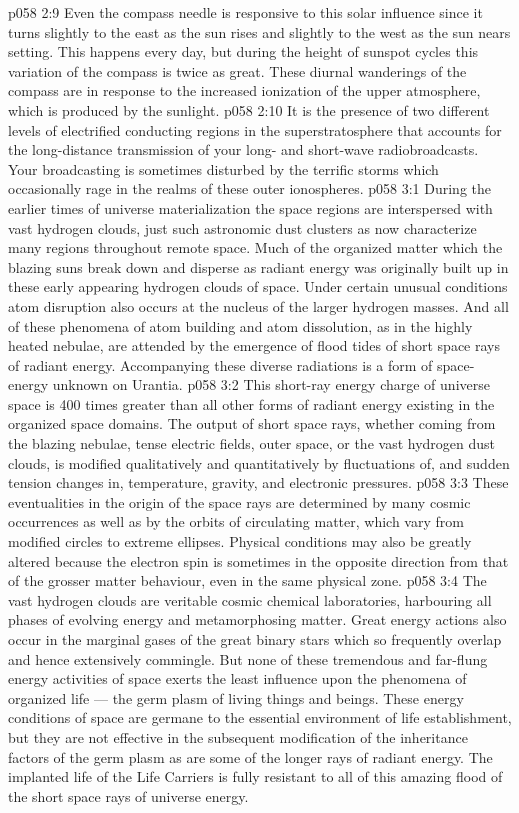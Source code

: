 \vs p058 2:9 Even the compass needle is responsive to this solar influence since it turns slightly to the east as the sun rises and slightly to the west as the sun nears setting. This happens every day, but during the height of sunspot cycles this variation of the compass is twice as great. These diurnal wanderings of the compass are in response to the increased ionization of the upper atmosphere, which is produced by the sunlight.
\vs p058 2:10 It is the presence of two different levels of electrified conducting regions in the superstratosphere that accounts for the long\hyp{}distance transmission of your long\hyp{} and short\hyp{}wave radiobroadcasts. Your broadcasting is sometimes disturbed by the terrific storms which occasionally rage in the realms of these outer ionospheres.
\vs p058 3:1 During the earlier times of universe materialization the space regions are interspersed with vast hydrogen clouds, just such astronomic dust clusters as now characterize many regions throughout remote space. Much of the organized matter which the blazing suns break down and disperse as radiant energy was originally built up in these early appearing hydrogen clouds of space. Under certain unusual conditions atom disruption also occurs at the nucleus of the larger hydrogen masses. And all of these phenomena of atom building and atom dissolution, as in the highly heated nebulae, are attended by the emergence of flood tides of short space rays of radiant energy. Accompanying these diverse radiations is a form of space\hyp{}energy unknown on Urantia.
\vs p058 3:2 This short\hyp{}ray energy charge of universe space is 400 times greater than all other forms of radiant energy existing in the organized space domains. The output of short space rays, whether coming from the blazing nebulae, tense electric fields, outer space, or the vast hydrogen dust clouds, is modified qualitatively and quantitatively by fluctuations of, and sudden tension changes in, temperature, gravity, and electronic pressures.
\vs p058 3:3 These eventualities in the origin of the space rays are determined by many cosmic occurrences as well as by the orbits of circulating matter, which vary from modified circles to extreme ellipses. Physical conditions may also be greatly altered because the electron spin is sometimes in the opposite direction from that of the grosser matter behaviour, even in the same physical zone.
\vs p058 3:4 The vast hydrogen clouds are veritable cosmic chemical laboratories, harbouring all phases of evolving energy and metamorphosing matter. Great energy actions also occur in the marginal gases of the great binary stars which so frequently overlap and hence extensively commingle. But none of these tremendous and far\hyp{}flung energy activities of space exerts the least influence upon the phenomena of organized life --- the germ plasm of living things and beings. These energy conditions of space are germane to the essential environment of life establishment, but they are not effective in the subsequent modification of the inheritance factors of the germ plasm as are some of the longer rays of radiant energy. The implanted life of the Life Carriers is fully resistant to all of this amazing flood of the short space rays of universe energy.
